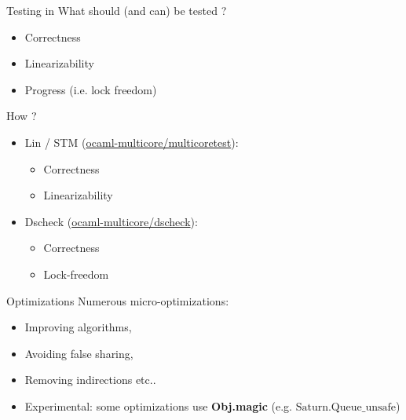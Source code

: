  \begin{frame}{Testing in \Saturn}
    What should (and can) be tested ?
    \begin{itemize}[label=$\bullet$]
     \item Correctness 
     \item Linearizability
     \item Progress (i.e. lock freedom) 
    \end{itemize}
    How ?
    \begin{itemize}[label=$\bullet$]
     \item Lin / STM (\href{https://github.com/ocaml-multicore/multicoretests}{ocaml-multicore/multicoretest}):
        \begin{itemize}[label=$\diamond$]
            \item Correctness
            \item Linearizability
        \end{itemize}
     \item Dscheck (\href{https://github.com/ocaml-multicore/dscheck}{ocaml-multicore/dscheck}):
     \begin{itemize}[label=$\diamond$]
        \item Correctness
        \item Lock-freedom
        \end{itemize}
    \end{itemize}
 
  \end{frame}



\begin{frame}{Optimizations}
    Numerous micro-optimizations:
    \begin{itemize}[label=$\diamond$]
        \item Improving algorithms,
        \item Avoiding false sharing,
        \item Removing indirections etc..
        \item Experimental: some optimizations use \textbf{Obj.magic} (e.g. $\text{Saturn.Queue\_unsafe}$)
    \end{itemize}
\end{frame}


